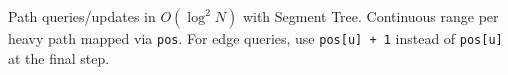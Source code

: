 
Path queries/updates in $O(\log^2 N)$ with Segment Tree. Continuous range per heavy path mapped via \lstinline|pos|. For edge queries, use \lstinline|pos[u] + 1| instead of \lstinline|pos[u]| at the final step.


